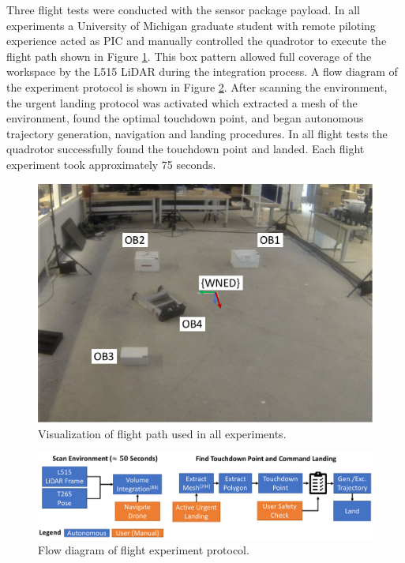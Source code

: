 Three flight tests were conducted with the sensor package payload. In all experiments a University of Michigan graduate student with remote piloting experience acted as \ac{PIC} and manually controlled the quadrotor to execute the flight path shown in Figure \ref{fig:ch7_flight_path}. This box pattern allowed full coverage of the workspace by the L515 LiDAR during the integration process.  A flow diagram of the experiment protocol is shown in Figure \ref{fig:ch7_flight_protocol}.  After scanning the environment, the urgent landing protocol was activated which extracted a mesh of the environment, found the optimal touchdown point, and began autonomous trajectory generation, navigation and landing procedures. In all flight tests the quadrotor successfully found the touchdown point and landed. Each flight experiment took approximately 75 seconds.


\begin{figure}[!htb]
    \centering  
    \includegraphics[page=3,width=.40\linewidth]{chapter_7_experiments/imgs/ExperimentSetup.pdf}
    \caption[Visualization of flight path used in all experiments]{Visualization of flight path used in all experiments.\label{fig:ch7_flight_path}}
\end{figure}

\begin{figure}[!htb]
    \centering  
   \includegraphics[width=.80\linewidth]{chapter_7_experiments/imgs/LandingProtocol.pdf}
    \caption[Flow diagram of flight experiment protocol]{Flow diagram of flight experiment protocol.\label{fig:ch7_flight_protocol}}
\end{figure}
 



